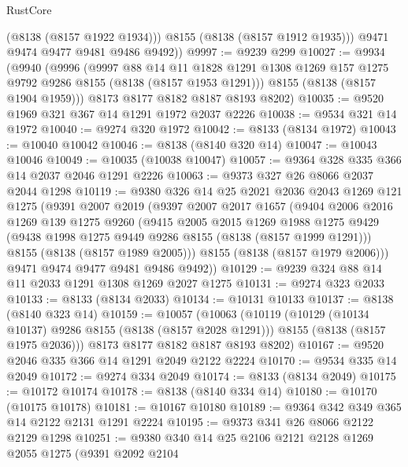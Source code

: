 \begin{lexlean}{RustCore}
\begin{coremodule}
            (@8138 (@8157 @1922 @1934)))
          @8155
          (@8138 (@8157 @1912 @1935)))
        @9471
        @9474
        @9477
        @9481
        @9486
        @9492))
@9997 := @9239 @299
@10027 := @9934
    (@9940
      (@9996
        (@9997
          @88
          @14
          @11
          @1828
          @1291
          @1308
          @1269
          @157
          @1275
          @9792
          @9286
          @8155
          (@8138 (@8157 @1953 @1291)))
        @8155
        (@8138 (@8157 @1904 @1959)))
      @8173
      @8177
      @8182
      @8187
      @8193
      @8202)
@10035 := @9520 @1969 @321 @367 @14 @1291 @1972 @2037 @2226
@10038 := @9534 @321 @14 @1972
@10040 := @9274 @320 @1972
@10042 := @8133 (@8134 @1972)
@10043 := @10040 @10042
@10046 := @8138 (@8140 @320 @14)
@10047 := @10043 @10046
@10049 := @10035 (@10038 @10047)
@10057 := @9364 @328 @335 @366 @14 @2037 @2046 @1291 @2226
@10063 := @9373 @327 @26 @8066 @2037 @2044 @1298
@10119 := @9380
    @326
    @14
    @25
    @2021
    @2036
    @2043
    @1269
    @121
    @1275
    (@9391
      @2007
      @2019
      (@9397
        @2007
        @2017
        @1657
        (@9404
          @2006
          @2016
          @1269
          @139
          @1275
          @9260
          (@9415
            @2005
            @2015
            @1269
            @1988
            @1275
            @9429
            (@9438 @1998 @1275 @9449 @9286 @8155 (@8138 (@8157 @1999 @1291)))
            @8155
            (@8138 (@8157 @1989 @2005)))
          @8155
          (@8138 (@8157 @1979 @2006)))
        @9471
        @9474
        @9477
        @9481
        @9486
        @9492))
@10129 := @9239 @324 @88 @14 @11 @2033 @1291 @1308 @1269 @2027 @1275
@10131 := @9274 @323 @2033
@10133 := @8133 (@8134 @2033)
@10134 := @10131 @10133
@10137 := @8138 (@8140 @323 @14)
@10159 := @10057
    (@10063
      (@10119
        (@10129 (@10134 @10137) @9286 @8155 (@8138 (@8157 @2028 @1291)))
        @8155
        (@8138 (@8157 @1975 @2036)))
      @8173
      @8177
      @8182
      @8187
      @8193
      @8202)
@10167 := @9520 @2046 @335 @366 @14 @1291 @2049 @2122 @2224
@10170 := @9534 @335 @14 @2049
@10172 := @9274 @334 @2049
@10174 := @8133 (@8134 @2049)
@10175 := @10172 @10174
@10178 := @8138 (@8140 @334 @14)
@10180 := @10170 (@10175 @10178)
@10181 := @10167 @10180
@10189 := @9364 @342 @349 @365 @14 @2122 @2131 @1291 @2224
@10195 := @9373 @341 @26 @8066 @2122 @2129 @1298
@10251 := @9380
    @340
    @14
    @25
    @2106
    @2121
    @2128
    @1269
    @2055
    @1275
    (@9391
      @2092
      @2104

\end{coremodule}
\end{lexlean}
